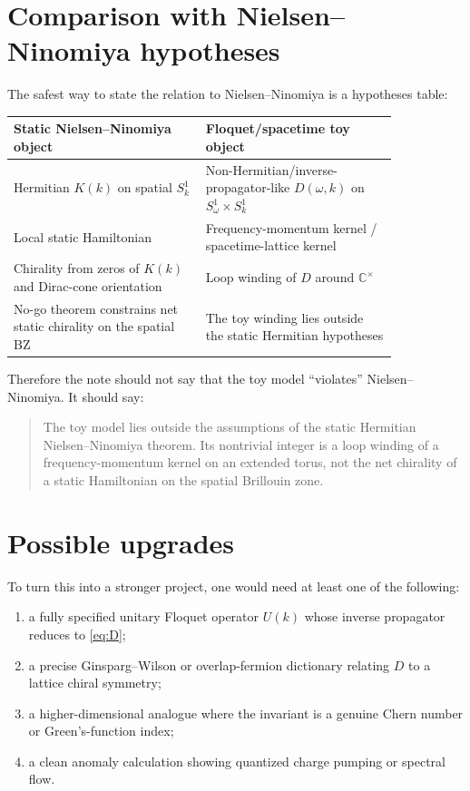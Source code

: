\documentclass[11pt]{article}
\newcommand{\CC}{\mathbb{C}}
\begin{document}
\section{Comparison with Nielsen--Ninomiya hypotheses}

The safest way to state the relation to Nielsen--Ninomiya is a hypotheses table:

\begin{center}
\begin{tabular}{p{0.42\linewidth}p{0.42\linewidth}}
\hline
Static Nielsen--Ninomiya object & Floquet/spacetime toy object \\
\hline
Hermitian \(K(k)\) on spatial \(S^1_k\) & Non-Hermitian/inverse-propagator-like \(D(\omega,k)\) on \(S^1_\omega\times S^1_k\) \\
Local static Hamiltonian & Frequency-momentum kernel / spacetime-lattice kernel \\
Chirality from zeros of \(K(k)\) and Dirac-cone orientation & Loop winding of \(D\) around \(\CC^\times\) \\
No-go theorem constrains net static chirality on the spatial BZ & The toy winding lies outside the static Hermitian hypotheses \\
\hline
\end{tabular}
\end{center}

Therefore the note should not say that the toy model ``violates'' Nielsen--Ninomiya.  It should say:

\begin{quote}
The toy model lies outside the assumptions of the static Hermitian Nielsen--Ninomiya theorem.  Its nontrivial integer is a loop winding of a frequency-momentum kernel on an extended torus, not the net chirality of a static Hamiltonian on the spatial Brillouin zone.
\end{quote}

\section{Possible upgrades}

To turn this into a stronger project, one would need at least one of the following:
\begin{enumerate}[label=(\alph*)]
  \item a fully specified unitary Floquet operator \(U(k)\) whose inverse propagator reduces to \eqref{eq:D};
  \item a precise Ginsparg--Wilson or overlap-fermion dictionary relating \(D\) to a lattice chiral symmetry;
  \item a higher-dimensional analogue where the invariant is a genuine Chern number or Green's-function index;
  \item a clean anomaly calculation showing quantized charge pumping or spectral flow.
\end{enumerate}
\end{document}
